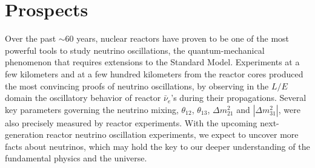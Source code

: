 \section{Prospects} 
\label{sec:prospects}

Over the past $\sim$60 years, nuclear reactors have proven to be one of the most powerful tools to study neutrino oscillations, the quantum-mechanical phenomenon that requires extensions to the Standard Model. Experiments at a few kilometers and at a few hundred kilometers from the reactor cores produced the most convincing proofs of neutrino oscillations, by observing in the $L/E$ domain the oscillatory behavior of reactor $\bar\nu_e$'s during their propagations. Several key parameters governing the neutrino mixing, $\theta_{12}$, $\theta_{13}$, $\Delta{m}^2_{21}$ and $|\Delta{m}^2_{31}|$, were also precisely measured by reactor experiments. With the upcoming next-generation reactor neutrino oscillation experiments, we expect to uncover more facts about neutrinos, which may hold the key to our deeper understanding of the fundamental physics and the universe.

